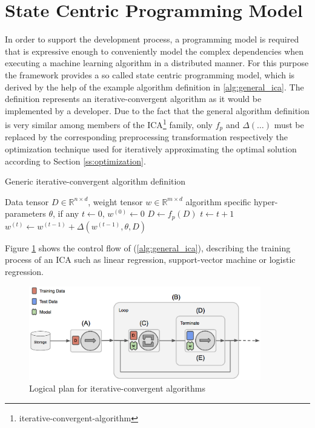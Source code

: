 \section{State Centric Programming Model}
In order to support the development process, a programming model is required that is expressive enough to conveniently model the complex dependencies when executing a machine learning algorithm in a distributed manner.
For this purpose the framework provides a so called state centric programming model, which is derived by the help of the example algorithm definition in \ref{alg:general_ica}.
The definition represents an iterative-convergent algorithm as it would be implemented by a developer.
Due to the fact that the general algorithm definition is very similar among members of the ICA\footnote{iterative-convergent-algorithm} family, only $f_p$ and $\Delta(\ldots)$ must be replaced by the corresponding preprocessing transformation respectively the optimization technique used for iteratively approximating the optimal solution according to Section \ref{ss:optimization}.
\begin{algorithm}
\caption{Generic iterative-convergent algorithm definition}\label{alg:general_ica}
\begin{algorithmic}[1]{}
\ALGSTATE Data tensor $D \in \mathbb{R}^{n \times d}$, weight tensor $w \in \mathbb{R}^{m \times d}$
\INPUT algorithm specific hyper-parameters $\theta$, if any
\INIT $t \gets 0$, $w^{(0)} \gets 0$
\State $D \gets f_{p}(D)$ 
\Repeat {}
\State $t \gets t + 1$
\State $w^{(t)} \gets w^{(t-1)} + \Delta(w^{(t-1)}, \theta, D)$ 
 
\end{algorithmic}
\end{algorithm}
Figure \ref{fig:ica_control_flow} shows the control flow of (\ref{alg:general_ica}), describing the training process of an ICA such as linear regression, support-vector machine or logistic regression.
\begin{figure}[ht]
\centering
\includegraphics[width=0.9\textwidth]{img/ica_control_flow.png}
\caption{Logical plan for iterative-convergent algorithms}
\label{fig:ica_control_flow}
\end{figure}
